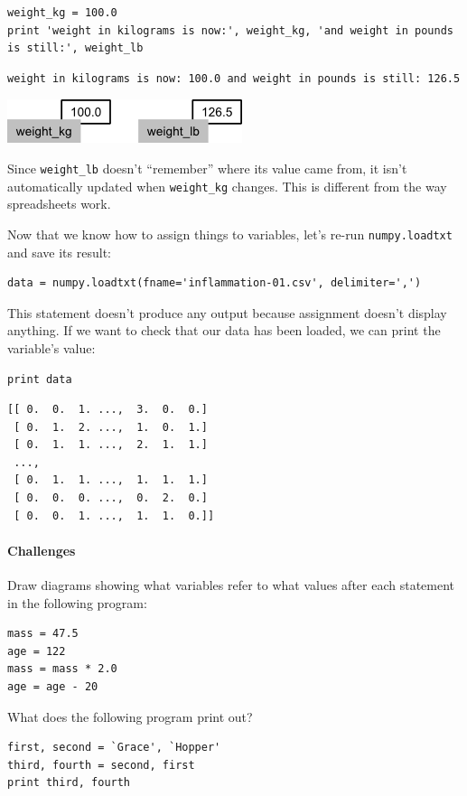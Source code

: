 \documentclass{book}
\begin{document}
\begin{verbatim}
weight_kg = 100.0
print 'weight in kilograms is now:', weight_kg, 'and weight in pounds is still:', weight_lb
\end{verbatim}

\begin{verbatim}
weight in kilograms is now: 100.0 and weight in pounds is still: 126.5
\end{verbatim}

\includegraphics{novice/python/img/python-sticky-note-variables-03.png}

Since \texttt{weight\_lb} doesn't ``remember'' where its value came
from, it isn't automatically updated when \texttt{weight\_kg} changes.
This is different from the way spreadsheets work.

Now that we know how to assign things to variables, let's re-run
\texttt{numpy.loadtxt} and save its result:

\begin{verbatim}
data = numpy.loadtxt(fname='inflammation-01.csv', delimiter=',')
\end{verbatim}

This statement doesn't produce any output because assignment doesn't
display anything. If we want to check that our data has been loaded, we
can print the variable's value:

\begin{verbatim}
print data
\end{verbatim}

\begin{verbatim}
[[ 0.  0.  1. ...,  3.  0.  0.]
 [ 0.  1.  2. ...,  1.  0.  1.]
 [ 0.  1.  1. ...,  2.  1.  1.]
 ...,
 [ 0.  1.  1. ...,  1.  1.  1.]
 [ 0.  0.  0. ...,  0.  2.  0.]
 [ 0.  0.  1. ...,  1.  1.  0.]]
\end{verbatim}

\mbox{}\paragraph{Challenges}

\begin{swcenumerate}
\item
  Draw diagrams showing what variables refer to what values after each
  statement in the following program:

\begin{verbatim}
mass = 47.5
age = 122
mass = mass * 2.0
age = age - 20
\end{verbatim}
\item
  What does the following program print out?
\begin{verbatim}
first, second = `Grace', `Hopper'
third, fourth = second, first
print third, fourth
\end{verbatim}
\end{swcenumerate}
\end{document}
